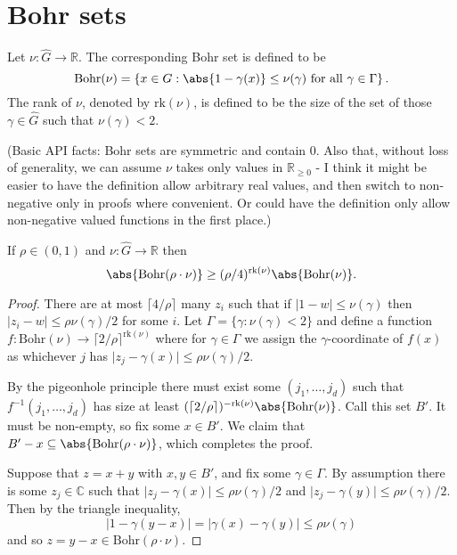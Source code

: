 \chapter{Bohr sets}

\begin{definition}
\label{bohr-set}
\leanok
Let $\nu: \widehat{G} \to \mathbb{R}$. The corresponding Bohr set is defined to be
\[\mathrm{Bohr}(\nu)=\left\{ x\in G : \abs{1-\gamma(x)}\leq \nu(\gamma)\textrm{ for all }\gamma\in\Gamma\right\}.\]
The rank of $\nu$, denoted by $\mathrm{rk}(\nu)$, is defined to be the size of the set of those $\gamma\in\widehat{G}$ such that $\nu(\gamma)<2$.

(Basic API facts: Bohr sets are symmetric and contain $0$. Also that, without loss of generality, we can assume $\nu$ takes only values in $\mathbb{R}_{\geq 0}$ - I think it might be easier to have the definition allow arbitrary real values, and then switch to non-negative only in proofs where convenient. Or could have the definition only allow non-negative valued functions in the first place.)
\end{definition}

\begin{lemma}
\label{bohr-size}
\leanok
If $\rho\in (0,1)$ and $\nu:\widehat{G}\to \mathbb{R}$ then
\[\abs{\mathrm{Bohr}(\rho\cdot \nu)}\geq (\rho/4)^{\mathrm{rk}(\nu)}\abs{\mathrm{Bohr}(\nu)}.\]
\end{lemma}
\begin{proof}
There are at most $\lceil 4/\rho\rceil$ many $z_i$ such that if $\lvert 1-w\rvert \leq \nu(\gamma)$ then $\lvert z_i-w\rvert\leq \rho\nu(\gamma)/2$ for some $i$. Let $\Gamma=\{ \gamma : \nu(\gamma) <2\}$ and define a function $f:\mathrm{Bohr}(\nu)\to \lceil 2/\rho\rceil^{\mathrm{rk}(\nu)}$ where for $\gamma\in \Gamma$ we assign the $\gamma$-coordinate of $f(x)$ as whichever $j$ has $\lvert z_j-\gamma(x)\rvert \leq \rho\nu(\gamma)/2$.

By the pigeonhole principle there must exist some $(j_1,\ldots,j_{d})$ such that $f^{-1}(j_1,\ldots,j_d)$ has size at least $(\lceil 2/\rho\rceil)^{-\mathrm{rk}(\nu)}\abs{\mathrm{Bohr}(\nu)}$. Call this set $B'$. It must be non-empty, so fix some $x\in B'$. We claim that $B'-x\subseteq \abs{\mathrm{Bohr}(\rho\cdot \nu)}$, which completes the proof.

Suppose that $z=x+y$ with $x,y\in B'$, and fix some $\gamma\in \Gamma$. By assumption there is some $z_j\in \mathbb{C}$ such that $\lvert z_j-\gamma(x)\rvert \leq \rho \nu(\gamma)/2$ and $\lvert z_j-\gamma(y)\rvert \leq \rho \nu(\gamma)/2$. Then by the triangle inequality,
\[\lvert 1-\gamma(y-x)\rvert=\lvert \gamma(x)-\gamma(y)\rvert \leq \rho \nu(\gamma)\]
and so $z=y-x\in \mathrm{Bohr}(\rho\cdot \nu)$.
\end{proof}

